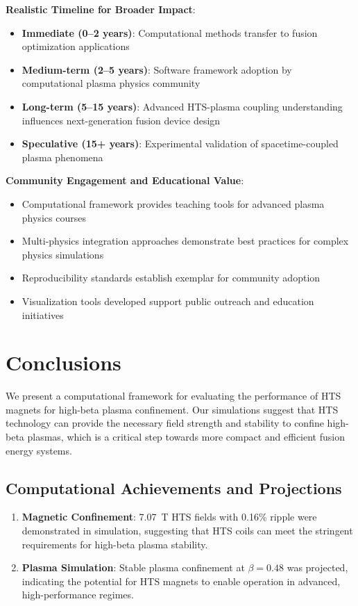 \documentclass[12pt,a4paper]{article}
\begin{document}
\textbf{Realistic Timeline for Broader Impact}:
\begin{itemize}
\item \textbf{Immediate (0--2 years)}: Computational methods transfer to fusion optimization applications
\item \textbf{Medium-term (2--5 years)}: Software framework adoption by computational plasma physics community
\item \textbf{Long-term (5--15 years)}: Advanced HTS-plasma coupling understanding influences next-generation fusion device design
\item \textbf{Speculative (15+ years)}: Experimental validation of spacetime-coupled plasma phenomena
\end{itemize}

\textbf{Community Engagement and Educational Value}:
\begin{itemize}
\item Computational framework provides teaching tools for advanced plasma physics courses
\item Multi-physics integration approaches demonstrate best practices for complex physics simulations  
\item Reproducibility standards establish exemplar for community adoption
\item Visualization tools developed support public outreach and education initiatives
\end{itemize}

\section{Conclusions}

We present a computational framework for evaluating the performance of HTS magnets for high-beta plasma confinement. Our simulations suggest that HTS technology can provide the necessary field strength and stability to confine high-beta plasmas, which is a critical step towards more compact and efficient fusion energy systems.

\subsection{Computational Achievements and Projections}
\begin{enumerate}
\item \textbf{Magnetic Confinement}: 7.07~T HTS fields with 0.16\% ripple were demonstrated in simulation, suggesting that HTS coils can meet the stringent requirements for high-beta plasma stability.
\item \textbf{Plasma Simulation}: Stable plasma confinement at $\beta=0.48$ was projected, indicating the potential for HTS magnets to enable operation in advanced, high-performance regimes.
\end{enumerate}
\end{document}
